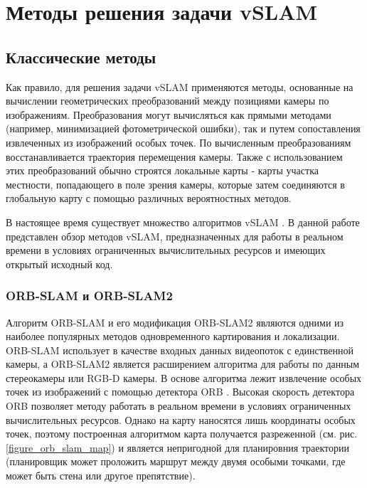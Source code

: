 \documentclass{mipt-thesis-ms}
\begin{document}
	
	\chapter{Методы решения задачи vSLAM}
	
	\section{Классические методы}
	
	Как правило, для решения задачи vSLAM применяются методы, основанные на вычислении геометрических преобразований между позициями камеры по изображениям. Преобразования могут вычисляться как прямыми методами (например, минимизацией фотометрической ошибки), так и путем сопоставления извлеченных из изображений особых точек. По вычисленным преобразованиям восстанавливается траектория перемещения камеры. Также с использованием этих преобразований обычно строятся локальные карты - карты участка местности, попадающего в поле зрения камеры, которые затем соединяются в глобальную карту с помощью различных вероятностных методов.
	
	В настоящее время существует множество алгоритмов vSLAM \cite{taketomi2017visual} \cite{fuentes2015visual}. В данной работе представлен обзор методов vSLAM, предназначенных для работы в реальном времени в условиях ограниченных вычислительных ресурсов и имеющих открытый исходный код.
	
	\subsection{ORB-SLAM и ORB-SLAM2}
	
	Алгоритм ORB-SLAM \cite{mur2015orb} и его модификация ORB-SLAM2 \cite{mur2017orb} являются одними из наиболее популярных методов одновременного картирования и локализации. ORB-SLAM использует в качестве входных данных видеопоток с единственной камеры, а ORB-SLAM2 является расширением алгоритма для работы по данным стереокамеры или RGB-D камеры. В основе алгоритма лежит извлечение особых точек из изображений с помощью детектора ORB \cite{rublee2011orb}. Высокая скорость детектора ORB позволяет методу работать в реальном времени в условиях ограниченных вычислительных ресурсов. Однако на карту наносятся лишь координаты особых точек, поэтому построенная алгоритмом карта получается разреженной (см. рис. \ref{figure_orb_slam_map}) и является непригодной для планировния траектории (планировщик может проложить маршрут между двумя особыми точками, где может быть стена или другое препятствие).
\end{document}
